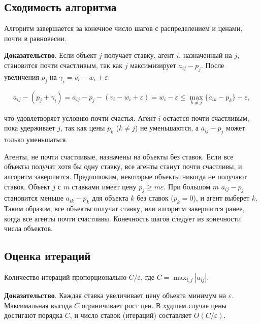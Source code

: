 \subsection{Сходимость алгоритма}
\begin{theorem}
\label{thm:auction_convergence}
Алгоритм завершается за конечное число шагов с распределением и ценами, почти в равновесии.
\end{theorem}

\textbf{Доказательство}. Если объект $j$ получает ставку, агент $i$, назначенный на $j$, становится почти счастливым, так как $j$ максимизирует $a_{ij} - p_j$. После увеличения $p_j$ на $\gamma_i = v_i - w_i + \varepsilon$:

\[
a_{i j} - (p_j + \gamma_i) = a_{i j} - p_j - (v_i - w_i + \varepsilon) = w_i - \varepsilon \leq \max_{k \neq j} \{a_{ik} - p_k\} - \varepsilon,
\]

что удовлетворяет условию почти счастья. Агент $i$ остается почти счастливым, пока удерживает $j$, так как цены $p_k$ ($k \neq j$) не уменьшаются, а $a_{i j} - p_j$ может только уменьшаться.

Агенты, не почти счастливые, назначены на объекты без ставок. Если все объекты получат хотя бы одну ставку, все агенты станут почти счастливы, и алгоритм завершится. Предположим, некоторые объекты никогда не получают ставок. Объект $j$ с $m$ ставками имеет цену $p_j \geq m \varepsilon$. При большом $m$ $a_{i j} - p_j$ становится меньше $a_{i k} - p_k$ для объекта $k$ без ставок ($p_k = 0$), и агент выберет $k$. Таким образом, все объекты получат ставку, или алгоритм завершится ранее, когда все агенты почти счастливы. Конечность шагов следует из конечности числа объектов.

\subsection{Оценка итераций}
\begin{claim}
\label{claim:auction_iterations}
Количество итераций пропорционально $C / \varepsilon$, где $C = \max_{i,j} |a_{ij}|$.
\end{claim}

\textbf{Доказательство}. Каждая ставка увеличивает цену объекта минимум на $\varepsilon$. Максимальная выгода $C$ ограничивает рост цен. В худшем случае цены достигают порядка $C$, и число ставок (итераций) составляет $O(C / \varepsilon)$.

